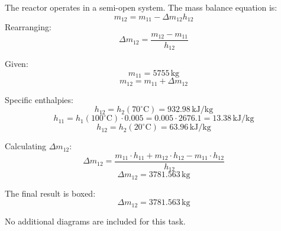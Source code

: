 The reactor operates in a semi-open system. The mass balance equation is:  
\[
m_{12} = m_{11} - \Delta m_{12} h_{12}
\]  
Rearranging:  
\[
\Delta m_{12} = \frac{m_{12} - m_{11}}{h_{12}}
\]  

Given:  
\[
m_{11} = 5755 \, \text{kg}
\]  
\[
m_{12} = m_{11} + \Delta m_{12}
\]  

Specific enthalpies:  
\[
h_{12} = h_2(70^\circ\text{C}) = 932.98 \, \text{kJ/kg}
\]  
\[
h_{11} = h_1(100^\circ\text{C}) \cdot 0.005 = 0.005 \cdot 2676.1 = 13.38 \, \text{kJ/kg}
\]  
\[
h_{12} = h_2(20^\circ\text{C}) = 63.96 \, \text{kJ/kg}
\]  

Calculating \( \Delta m_{12} \):  
\[
\Delta m_{12} = \frac{m_{11} \cdot h_{11} + m_{12} \cdot h_{12} - m_{11} \cdot h_{12}}{h_{12}}
\]  
\[
\Delta m_{12} = 3781.563 \, \text{kg}
\]  

The final result is boxed:  
\[
\Delta m_{12} = 3781.563 \, \text{kg}
\]  

No additional diagrams are included for this task.